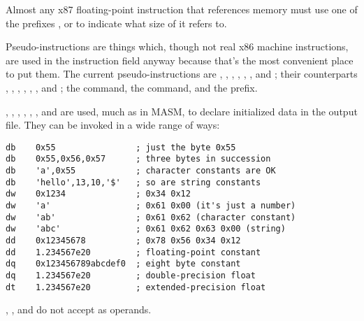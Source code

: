 Almost any x87 floating-point instruction that references memory must
use one of the prefixes ,  or
 to indicate what size of 
it refers to.


Pseudo-instructions are things which, though not real x86 machine
instructions, are used in the instruction field anyway because that's
the most convenient place to put them. The current pseudo-instructions
are , , , ,
, ,  and ;
their  counterparts ,
, , ,
, ,  and
; the  command, the 
command, and the  prefix.


, , , ,
, ,  and 
are used, much as in MASM, to declare initialized data in
the output file. They can be invoked in a wide range of ways:

\begin{lstlisting}
db    0x55                ; just the byte 0x55
db    0x55,0x56,0x57      ; three bytes in succession
db    'a',0x55            ; character constants are OK
db    'hello',13,10,'$'   ; so are string constants
dw    0x1234              ; 0x34 0x12
dw    'a'                 ; 0x61 0x00 (it's just a number)
dw    'ab'                ; 0x61 0x62 (character constant)
dw    'abc'               ; 0x61 0x62 0x63 0x00 (string)
dd    0x12345678          ; 0x78 0x56 0x34 0x12
dd    1.234567e20         ; floating-point constant
dq    0x123456789abcdef0  ; eight byte constant
dq    1.234567e20         ; double-precision float
dt    1.234567e20         ; extended-precision float
\end{lstlisting}

, ,  and  do not accept
 as operands.



